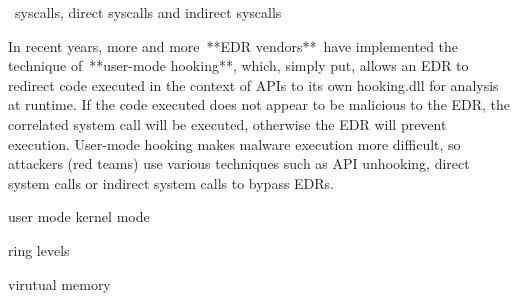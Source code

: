  syscalls, direct syscalls and indirect syscalls

In recent years, more and more **EDR vendors** have implemented the technique of **user-mode hooking**, which, simply put, allows an EDR to redirect code executed in the context of APIs to its own hooking.dll for analysis at runtime. If the code executed does not appear to be malicious to the EDR, the correlated system call will be executed, otherwise the EDR will prevent execution. User-mode hooking makes malware execution more difficult, so attackers (red teams) use various techniques such as API unhooking, direct system calls or indirect system calls to bypass EDRs.

user mode kernel mode

ring levels

virutual memory